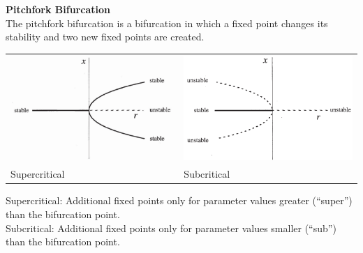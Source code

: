 \textbf{Pitchfork Bifurcation}\\
The pitchfork bifurcation is a bifurcation in which a fixed point changes its stability and two new fixed points are created.\\
\begin{table}[H]
  \setlength{\tabcolsep}{0.2em}
  \footnotesize
  \begin{tabular}{p{}@{\hskip 1em}p{}}
    \includegraphics[width=\linewidth]{Pics/9.2.png} & \includegraphics[width=\linewidth]{Pics/9.3.png}\\
    Supercritical & Subcritical
  \end{tabular}
\end{table}
Supercritical: Additional fixed points only for parameter values greater (“super”) than the bifurcation point.\\
Subcritical: Additional fixed points only for parameter values smaller (“sub”) than the bifurcation point.\\


